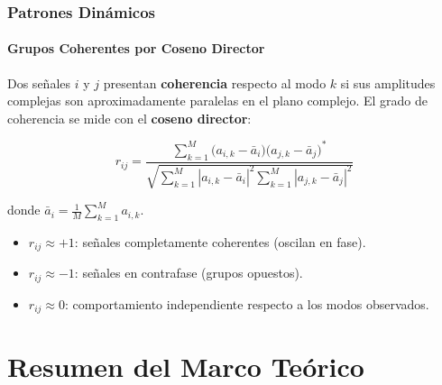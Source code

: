 \documentclass{beamer}
\begin{document}
\begin{frame}
\frametitle{Patrones Dinámicos}
\framesubtitle{Grupos Coherentes por Coseno Director}

Dos señales $i$ y $j$ presentan \textbf{coherencia} respecto al modo $k$
si sus amplitudes complejas son aproximadamente paralelas en el plano complejo.
El grado de coherencia se mide con el \textbf{coseno director}:

\begin{equation}
    r_{ij} =
    \frac{\displaystyle\sum_{k=1}^{M}
          \bigl(a_{i,k} - \bar{a}_i\bigr)\bigl(a_{j,k} - \bar{a}_j\bigr)^*}
         {\sqrt{\displaystyle\sum_{k=1}^{M}|a_{i,k}-\bar{a}_i|^2
                \displaystyle\sum_{k=1}^{M}|a_{j,k}-\bar{a}_j|^2}}
    \label{eq:direction_cosine_art}
\end{equation}

donde $\bar{a}_i = \frac{1}{M}\sum_{k=1}^{M} a_{i,k}$.

\end{frame}


\begin{frame}
    \begin{itemize}
    \item $r_{ij} \approx +1$: señales completamente coherentes (oscilan en fase).
    \item $r_{ij} \approx -1$: señales en contrafase (grupos opuestos).
    \item $r_{ij} \approx 0$: comportamiento independiente respecto a los modos observados.
\end{itemize}
\end{frame}


\section{Resumen del Marco Teórico}
\end{document}
